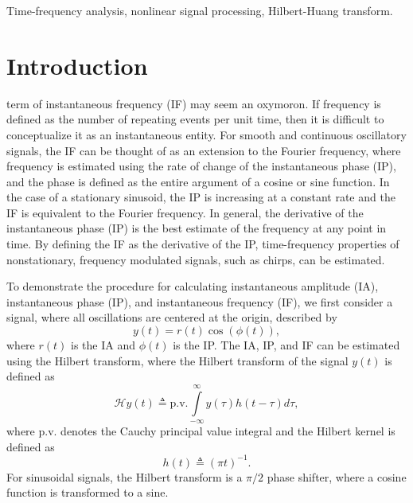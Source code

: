 \documentclass[11pt,draftcls,onecolumn]{IEEEtran}
\begin{document}
\begin{IEEEkeywords}
Time-frequency analysis, nonlinear signal processing, Hilbert-Huang transform.
\end{IEEEkeywords}

\IEEEpeerreviewmaketitle

\section{Introduction}
 term of instantaneous frequency (IF) may seem an oxymoron. If frequency is defined as the number of repeating events per unit time, then it is difficult to conceptualize it as an instantaneous entity. For smooth and continuous oscillatory signals, the IF can be thought of as an extension to the Fourier frequency, where frequency is estimated using the rate of change of the instantaneous phase (IP), and the phase is defined as the entire argument of a cosine or sine function. In the case of a stationary sinusoid, the IP is increasing at a constant rate and the IF is equivalent to the Fourier frequency. In general, the derivative of the instantaneous phase (IP) is the best estimate of the frequency at any point in time. By defining the IF as the derivative of the IP, time-frequency properties of nonstationary, frequency modulated signals, such as chirps, can be estimated. 

To demonstrate the procedure for calculating instantaneous amplitude (IA), instantaneous phase (IP), and instantaneous frequency (IF), we first consider a signal, where all oscillations are centered at the origin, described by
\begin{equation}
	y(t) = r(t)\cos(\phi(t)),
\end{equation}
where $r(t)$ is the IA and $\phi(t)$ is the IP. The IA, IP, and IF can be estimated using the Hilbert transform, where the Hilbert transform of the signal $y(t)$ is defined as
\begin{equation}\label{eq:HilbertTransform}
	\mathcal{H}y\left( t \right) \triangleq \textrm{p.v.}\int\limits_{ - \infty }^\infty  {y\left( \tau  \right)h\left( {t - \tau } \right)} d\tau,
\end{equation}
where $\textrm{p.v.}$ denotes the Cauchy principal value integral and the Hilbert kernel is defined as
\begin{equation}\label{eq:HilbertKernel}
	h\left( t \right) \triangleq {\left( {\pi t} \right)^{ - 1}}.
\end{equation}
For sinusoidal signals, the Hilbert transform is a $\pi/2$ phase shifter, where a cosine function is transformed to a sine.
\end{document}
